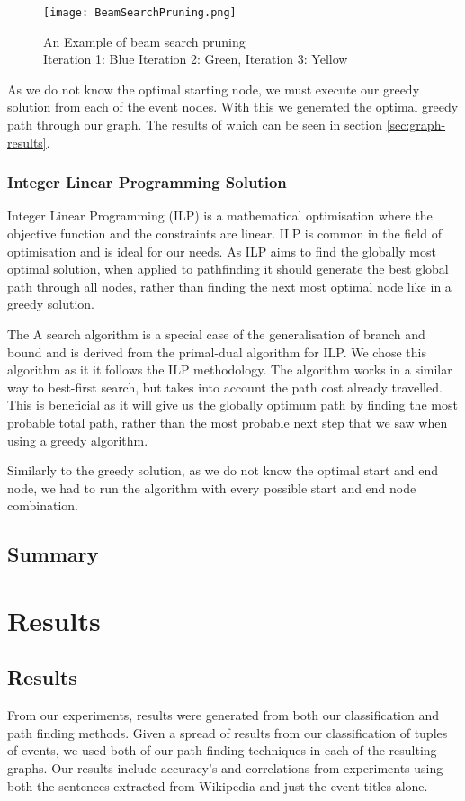 \documentclass[bsc,frontabs,twoside,singlespacing,parskip,deptreport]{infthesis}     %
\begin{document}
\begin{figure}
  \texttt{[image: BeamSearchPruning.png]}
  \caption{An Example of beam search pruning\\ Iteration 1: Blue Iteration 2: Green, Iteration 3: Yellow}
  \label{fig:beam-prune}
\end{figure}

As we do not know the optimal starting node, we must execute our greedy solution from each of the event nodes.
With this we generated the optimal greedy path through our graph. The results of which can be seen in section \ref{sec:graph-results}.

\subsection{Integer Linear Programming Solution}
Integer Linear Programming (ILP) is a mathematical optimisation where the objective function and the constraints are linear.
ILP is common in the field of optimisation and is ideal for our needs. As ILP aims to find the globally most optimal solution, when applied to pathfinding it
should generate the best global path through all nodes, rather than finding the next most optimal node like in a greedy solution.


The A\* search algorithm is a special case of the generalisation of branch and bound\cite{balas1983branch} and is derived from the primal-dual algorithm for ILP\cite{ye2012note}.
We chose this algorithm as it it follows the ILP methodology. The algorithm works in a similar way to best-first search, but takes into account the path cost already travelled.
This is beneficial as it will give us the globally optimum path by finding the most probable total path, rather than the most probable next step that we saw when using a
greedy algorithm.

Similarly to the greedy solution, as we do not know the optimal start and end node, we had to run the algorithm with every possible start and end node combination.


\section{Summary}

\chapter{Results}
\section{Results}
From our experiments, results were generated from both our classification and path finding methods.
Given a spread of results from our classification of tuples of events, we used both of our path finding
techniques in each of the resulting graphs. Our results include accuracy's and correlations from
experiments using both the sentences extracted from Wikipedia and just the event titles alone.   
\end{document}
